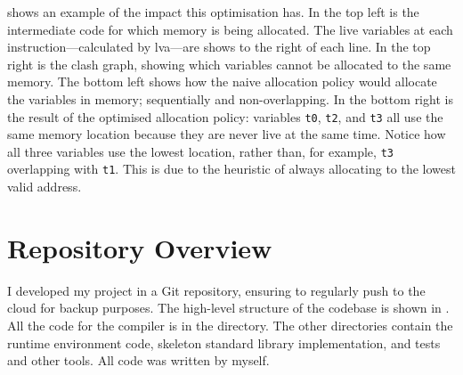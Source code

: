 \documentclass[00-main.tex]{subfiles}
\begin{document}
 shows an example of the impact this optimisation has.
In the top left is the intermediate code for which memory is being allocated.
The live variables at each instruction---calculated by \gls{lva}---are shows to the right of each line.
In the top right is the clash graph, showing which variables cannot be allocated to the same memory.
The bottom left shows how the naive allocation policy would allocate the variables in memory; sequentially and non-overlapping.
In the bottom right is the result of the optimised allocation policy: variables \texttt{t0}, \texttt{t2}, and \texttt{t3} all use the same memory location because they are never live at the same time.
Notice how all three variables use the lowest location, rather than, for example, \texttt{t3} overlapping with \texttt{t1}.
This is due to the heuristic of always allocating to the lowest valid address.


\section{Repository Overview}

I developed my project in a Git repository, ensuring to regularly push to the cloud for backup purposes.
The high-level structure of the codebase is shown in .
All the code for the compiler is in the  directory.
The other directories contain the runtime environment code, skeleton standard library implementation, and tests and other tools.
All code was written by myself.

\newlength\IndentWidth\setlength\IndentWidth{1em}
\end{document}
